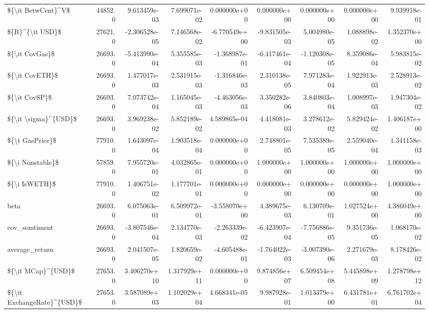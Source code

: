 \begin{tabular}{lrrrrrrrr}
\$\{\textbackslash it BetwCent\}\textasciicircum V\$         &  44852.0 &   9.613459e-03 &  7.699071e-02 &  0.000000e+00 &  0.000000e+00 &  0.000000e+00 &  0.000000e+00 &   9.939918e-01 \\
\$\{R\}\textasciicircum \{\textbackslash it USD\}\$            &  27621.0 &  -2.306528e-05 &  7.146568e-02 & -6.770549e+00 & -9.831505e-03 &  5.004980e-05 &  1.088898e-02 &   1.352370e+00 \\
\$\{\textbackslash it CovGas\}\$             &  26693.0 &  -5.413990e-04 &  5.355585e-03 & -1.368987e-01 & -6.417461e-04 & -1.120308e-05 &  8.359086e-04 &   5.983815e-02 \\
\$\{\textbackslash it CovETH\}\$             &  26693.0 &   1.477017e-03 &  2.531915e-03 & -1.316846e-03 &  2.310138e-05 &  7.971283e-04 &  1.922913e-03 &   2.528913e-02 \\
\$\{\textbackslash it CovSP\}\$              &  26693.0 &   7.073742e-04 &  1.165045e-03 & -4.463056e-03 &  3.350282e-06 &  3.840803e-04 &  1.008997e-03 &   1.947304e-02 \\
\$\{\textbackslash it \textbackslash sigma\}\textasciicircum \{USD\}\$       &  26693.0 &   3.969238e-02 &  5.852189e-02 &  4.589865e-04 &  4.418081e-03 &  3.278612e-02 &  5.829424e-02 &   1.406187e+00 \\
\$\{\textbackslash t GasPrice\}\$            &  77910.0 &   1.643097e-04 &  1.903518e-04 &  0.000000e+00 &  2.748801e-05 &  7.535389e-05 &  2.559040e-04 &   1.341158e-03 \\
\$\{\textbackslash i Nonstable\}\$           &  57859.0 &   7.955720e-01 &  4.032865e-01 &  0.000000e+00 &  1.000000e+00 &  1.000000e+00 &  1.000000e+00 &   1.000000e+00 \\
\$\{\textbackslash i IsWETH\}\$              &  77910.0 &   1.406751e-02 &  1.177701e-01 &  0.000000e+00 &  0.000000e+00 &  0.000000e+00 &  0.000000e+00 &   1.000000e+00 \\
beta                       &  26693.0 &   6.075063e-01 &  6.509972e-01 & -3.558070e+00 &  4.389675e-03 &  6.130709e-01 &  1.027524e+00 &   4.386049e+00 \\
cov\_semtiment              &  26693.0 &  -3.807546e-04 &  2.134770e-03 & -2.263339e-02 & -6.423907e-04 & -7.756886e-05 &  9.351736e-05 &   1.068170e-02 \\
average\_return             &  26693.0 &   2.041507e-05 &  1.820659e-02 & -4.605488e-01 & -1.764022e-03 & -3.007390e-06 &  2.271679e-03 &   8.178426e-02 \\
\$\{\textbackslash it MCap\}\textasciicircum \{USD\}\$         &  27653.0 &   3.406270e+10 &  1.317929e+11 &  0.000000e+00 &  9.874856e+07 &  6.509454e+08 &  5.445898e+09 &   1.278798e+12 \\
\$\{\textbackslash it ExchangeRate\}\textasciicircum \{USD\}\$ &  27653.0 &   3.587089e+03 &  1.102029e+04 &  4.668341e-05 &  9.987928e-01 &  1.013379e+00 &  6.431781e+01 &   6.761702e+04 \\
\bottomrule
\end{tabular}
